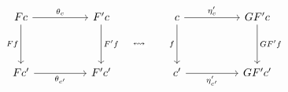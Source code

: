 \[\begin{tikzcd}
	Fc && {F'c} && c && {GF'c} \\
	\\
	{Fc'} && {F'c'} && {c'} && {GF'c'}
	\arrow["{\theta_{c}}", from=1-1, to=1-3]
	\arrow["{\theta_{c'}}"', from=3-1, to=3-3]
	\arrow["Ff"', from=1-1, to=3-1]
	\arrow[""{name=0, anchor=center, inner sep=0}, "{F'f}", from=1-3, to=3-3]
	\arrow[""{name=1, anchor=center, inner sep=0}, "f"', from=1-5, to=3-5]
	\arrow["{GF'f}", from=1-7, to=3-7]
	\arrow["{\eta_{c}'}", from=1-5, to=1-7]
	\arrow["{\eta_{c'}'}"', from=3-5, to=3-7]
	\arrow["\leftrightsquigarrow"{description}, draw=none, from=0, to=1]
\end{tikzcd}\]
